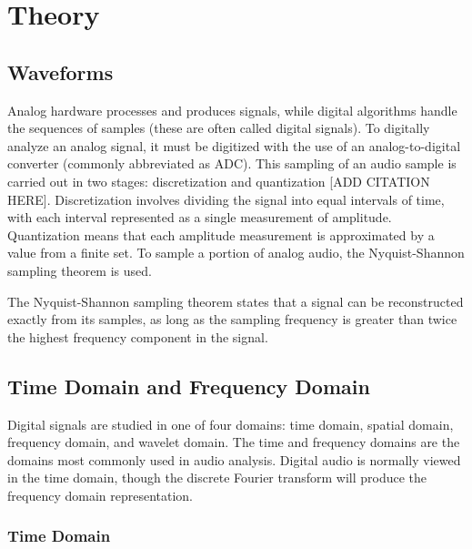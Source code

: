 \chapter[Theory]{Theory}\label{theory}

\section{Waveforms}


Analog hardware processes and produces signals, while digital algorithms handle the sequences of samples (these are often called digital signals). To digitally analyze an analog signal, it must be digitized with the use of an analog-to-digital converter (commonly abbreviated as ADC). This sampling of an audio sample is carried out in two stages: discretization and quantization [ADD CITATION HERE]. Discretization involves dividing the signal into equal intervals of time, with each interval represented as a single measurement of amplitude. Quantization means that each amplitude measurement is approximated by a value from a finite set. To sample a portion of analog audio, the Nyquist-Shannon sampling theorem is used. 

The Nyquist-Shannon sampling theorem states that a signal can be reconstructed exactly from its samples, as long as the sampling frequency is greater than twice the highest frequency component in the signal. 

\section{Time Domain and Frequency Domain}

Digital signals are studied in one of four domains: time domain, spatial domain, frequency domain, and wavelet domain. The time and frequency domains are the domains most commonly used in audio analysis. Digital audio is normally viewed in the time domain, though the discrete Fourier transform will produce the frequency domain representation. 

\subsection{Time Domain}

